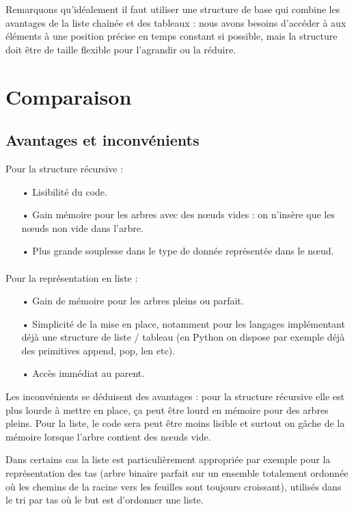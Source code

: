 \documentclass{report}
\begin{document}
Remarquons qu'idéalement il faut utiliser une structure de base qui combine les avantages de la liste chaînée et des tableaux : nous avons besoins d'accéder à aux éléments à une position précise en temps constant si possible, mais la structure doit être de taille flexible pour l'agrandir ou la réduire. 

\section{Comparaison}
\subsection{Avantages et inconvénients}
Pour la structure récursive :
\begin{itemize}
\item[•]
Lisibilité du code.
\item[•]
Gain mémoire pour les arbres avec des nœuds vides : on n'insère que les nœuds non vide dans l'arbre.
\item[•]
Plus grande souplesse dans le type de donnée représentée dans le nœud.
\end{itemize}
\paragraph*{}
Pour la représentation en liste :
\begin{itemize}
\item[•]
Gain de mémoire pour les arbres pleins ou parfait.
\item[•]
Simplicité de la mise en place, notamment pour les langages implémentant déjà une structure de liste / tableau (en Python on dispose par exemple déjà des primitives append, pop, len etc).
\item[•]
Accès immédiat au parent.
\end{itemize}
Les inconvénients se déduisent des avantages : pour la structure récursive elle est plus lourde à mettre en place, ça peut être lourd en mémoire pour des arbres pleins.
Pour la liste, le code sera peut être moins lisible et surtout on gâche de la mémoire lorsque l'arbre contient des nœuds vide. 

Dans certains cas la liste est particulièrement appropriée par exemple pour la représentation des tas (arbre binaire parfait sur un ensemble totalement ordonnée où les chemins de la racine vers les feuilles sont toujours croissant), utilisés dans le tri par tas où le but est d'ordonner une liste. 
\end{document}
